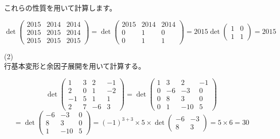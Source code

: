 \documentclass{jlreq}
\begin{document}
\begin{problem}
  これらの性質を用いて計算します。

  \begin{equation*}
    \det \begin{pmatrix}
      2015 & 2014 & 2014 \\
      2015 & 2015 & 2014 \\
      2015 & 2015 & 2015
    \end{pmatrix} = \det \begin{pmatrix}
      2015 & 2014 & 2014 \\
      0 & 1 & 0 \\
      0 & 1 & 1
    \end{pmatrix} = 2015 \det \begin{pmatrix}
      1 & 0 \\
      1 & 1
    \end{pmatrix} = 2015
  \end{equation*}

  (2) \\
  行基本変形と余因子展開を用いて計算する。
  
  \begin{equation*}
    \det \begin{pmatrix}
      1 & 3 & 2 & -1 \\
      2 & 0 & 1 & -2 \\
      -1 & 5 & 1 & 1 \\
      2 & 7 & -6 & 3
    \end{pmatrix} = \det \begin{pmatrix}
      1 & 3 & 2 & -1 \\
      0 & -6 & -3 & 0 \\
      0 & 8 & 3 & 0 \\
      0 & 1 & -10 & 5
    \end{pmatrix}
  \end{equation*}
  \begin{equation*}
    = \det \begin{pmatrix}
      -6 & -3 & 0 \\
      8 & 3 & 0 \\
      1 & -10 & 5
    \end{pmatrix} = (-1) ^ {3 + 3} \times 5 \times \det \begin{pmatrix}
      -6 & -3 \\
      8 & 3
    \end{pmatrix} = 5 \times 6 = 30
  \end{equation*}
\end{problem}
\end{document}
